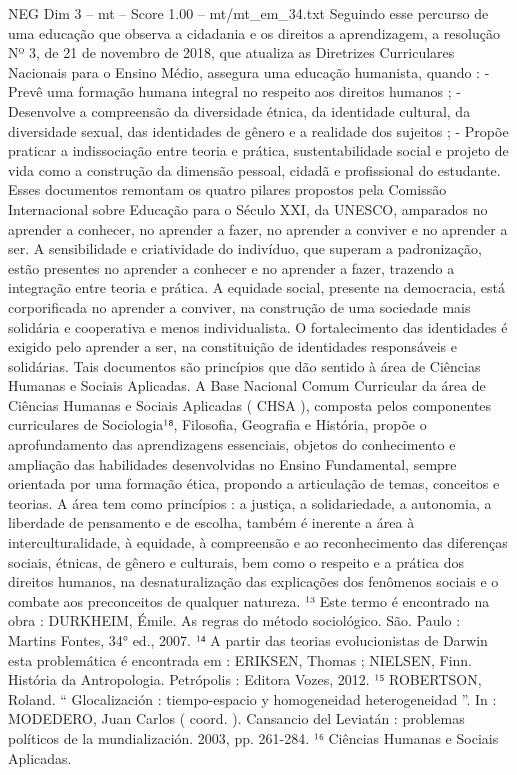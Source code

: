 \begin{textsample}{NEG Dim 3 – mt – Score 1.00 – mt/mt\_em\_34.txt}
Seguindo esse percurso de uma educação que observa a cidadania e os direitos a aprendizagem, a resolução Nº 3, de 21 de novembro de 2018, que atualiza as Diretrizes Curriculares Nacionais para o Ensino Médio, assegura uma educação humanista, quando : - Prevê uma formação humana integral no respeito aos direitos humanos ; - Desenvolve a compreensão da diversidade étnica, da identidade cultural, da diversidade sexual, das identidades de gênero e a realidade dos sujeitos ; - Propõe praticar a indissociação entre teoria e prática, sustentabilidade social e projeto de vida como a construção da dimensão pessoal, cidadã e profissional do estudante.
Esses documentos remontam os quatro pilares propostos pela Comissão Internacional sobre Educação para o Século XXI, da UNESCO, amparados no aprender a conhecer, no aprender a fazer, no aprender a conviver e no aprender a ser.
A sensibilidade e criatividade do indivíduo, que superam a padronização, estão presentes no aprender a conhecer e no aprender a fazer, trazendo a integração entre teoria e prática.
A equidade social, presente na democracia, está corporificada no aprender a conviver, na construção de uma sociedade mais solidária e cooperativa e menos individualista.
O fortalecimento das identidades é exigido pelo aprender a ser, na constituição de identidades responsáveis e solidárias.
Tais documentos são princípios que dão sentido à área de Ciências Humanas e Sociais Aplicadas.
A Base Nacional Comum Curricular da área de Ciências Humanas e Sociais Aplicadas ( CHSA ), composta pelos componentes curriculares de Sociologia¹⁸, Filosofia, Geografia e História, propõe o aprofundamento das aprendizagens essenciais, objetos do conhecimento e ampliação das habilidades desenvolvidas no Ensino Fundamental, sempre orientada por uma formação ética, propondo a articulação de temas, conceitos e teorias.
A área tem como princípios : a justiça, a solidariedade, a autonomia, a liberdade de pensamento e de escolha, também é inerente a área à interculturalidade, à equidade, à compreensão e ao reconhecimento das diferenças sociais, étnicas, de gênero e culturais, bem como o respeito e a prática dos direitos humanos, na desnaturalização das explicações dos fenômenos sociais e o combate aos preconceitos de qualquer natureza. ¹³ Este termo é encontrado na obra : DURKHEIM, Émile.
As regras do método sociológico.
São.
Paulo : Martins Fontes, 34{\EmojiFont °} ed., 2007. ¹⁴ A partir das teorias evolucionistas de Darwin esta problemática é encontrada em : ERIKSEN, Thomas ; NIELSEN, Finn.
História da Antropologia.
Petrópolis : Editora Vozes, 2012. ¹⁵ ROBERTSON, Roland. “ Glocalización : tiempo-espacio y homogeneidad heterogeneidad ”.
In : MODEDERO, Juan Carlos ( coord. ).
Cansancio del Leviatán : problemas políticos de la mundialización. 2003, pp. 261-284. ¹⁶ Ciências Humanas e Sociais Aplicadas.

\end{textsample}
